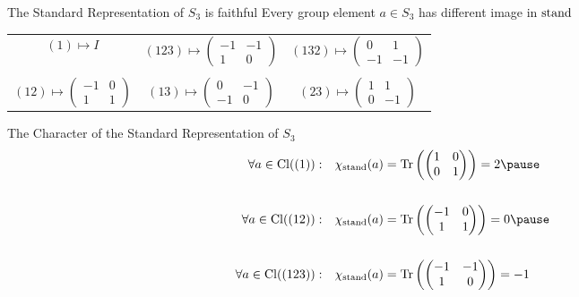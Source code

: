 \begin{frame}{The Standard Representation of $S_3$ is faithful}
    \large
    Every group element $a \in S_3$ has different image in $\operatorname{stand}$

    \pause
    \vspace{1em}
    \centering
    \begin{tabular}{c c c}
        $(1) \mapsto I$ & $(123) \mapsto \begin{pmatrix}
            -1 & -1 \\
            1 & 0
        \end{pmatrix}$ & $(132) \mapsto \begin{pmatrix}
            0 & 1 \\
            -1 & -1
        \end{pmatrix}$ \\\\ $(12) \mapsto \begin{pmatrix}
            -1 & 0 \\
            1 & 1
        \end{pmatrix}$ & $(13) \mapsto \begin{pmatrix}
            0 & -1 \\
            -1 & 0
        \end{pmatrix}$ & $(23) \mapsto \begin{pmatrix}
            1 & 1 \\
            0 & -1
        \end{pmatrix}$
    \end{tabular}
\end{frame}

\begin{frame}{The Character of the Standard Representation of $S_3$}
    \large
   \begin{align*}
    \forall a \in \Cl((1)): \quad & \chi_{\stand}(a) = \Tr\left(
        \begin{pmatrix}
            1 & 0 \\
            0 & 1
        \end{pmatrix}
    \right) = 2 \pause \\\\
    \forall a \in \Cl((12)): \quad & \chi_{\stand}(a) = \Tr\left(
        \begin{pmatrix}
            -1 & 0 \\
            1 & 1
        \end{pmatrix}
    \right) = 0 \pause \\\\
    \forall a \in \Cl((123)): \quad & \chi_{\stand}(a) = \Tr\left(
        \begin{pmatrix}
            -1 & -1 \\
            1 & 0
        \end{pmatrix}
    \right) = -1
   \end{align*} 
\end{frame}

